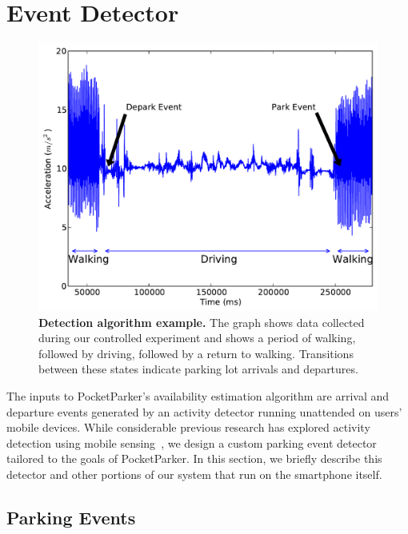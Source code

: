 \section{Event Detector}
\label{sec-detector}

\begin{figure}
\centering
\includegraphics[width=\columnwidth]{./figures/Detection.pdf}

\caption{\textbf{Detection algorithm example.} The graph shows data collected
during our controlled experiment and shows a period of walking, followed by
driving, followed by a return to walking. Transitions between these states
indicate parking lot arrivals and departures.}

\label{fig-detectionexample}
\end{figure}

The inputs to PocketParker's availability estimation algorithm are arrival and
departure events generated by an activity detector running unattended on users'
mobile devices.  While considerable previous research has explored activity
detection using mobile sensing~\cite{Constandache:2010:DYS, Keally:2011:PTP,
Reddy:2010:UMP, Yang:2011:DDP, Wang:2009:FEE}, we design a custom parking event
detector tailored to the goals of PocketParker.  In this section, we briefly
describe this detector and other portions of our system that run on the
smartphone itself.  

\subsection{Parking Events}
\label{subsec-goals}


